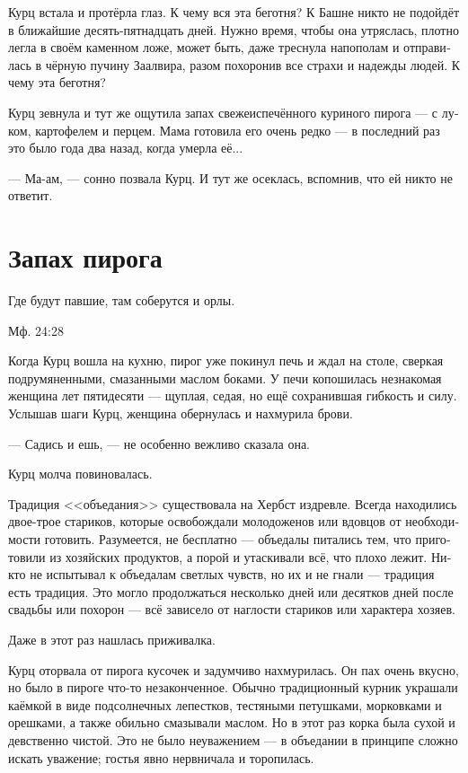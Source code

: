 \documentclass[a4paper,12pt,fleqn]{book}\usepackage{polyglossia}\setdefaultlanguage[babelshorthands=true]{russian}\setotherlanguage{english}\defaultfontfeatures{Ligatures=TeX,Mapping=tex-text}\usepackage{xcolor}\newcommand{\ml}[3]{#2}
\begin{document}
Курц встала и протёрла глаз.
К чему вся эта беготня?
К Башне никто не подойдёт в ближайшие десять-пятнадцать дней.
Нужно время, чтобы она утряслась, плотно легла в своём каменном ложе, может быть, даже треснула напополам и отправилась в чёрную пучину Заалвира, разом похоронив все страхи и надежды людей.
К чему эта беготня?

Курц зевнула и тут же ощутила запах свежеиспечённого куриного пирога --- с луком, картофелем и перцем.
Мама готовила его очень редко --- в последний раз это было года два назад, когда умерла её...

--- Ма-ам, --- сонно позвала Курц.
И тут же осеклась, вспомнив, что ей никто не ответит.

\section{Запах пирога}

\epigraph
{
\ml{$0$}
{Где будут павшие, там соберутся и орлы.}
{Wherever the dead shall be, there the eagles shall gather.}
}{Мф. 24:28}

Когда Курц вошла на кухню, пирог уже покинул печь и ждал на столе, сверкая подрумяненными, смазанными маслом боками.
У печи копошилась незнакомая женщина лет пятидесяти --- щуплая, седая, но ещё сохранившая гибкость и силу.
Услышав шаги Курц, женщина обернулась и нахмурила брови.

--- Садись и ешь, --- не особенно вежливо сказала она.

Курц молча повиновалась.

Традиция <<объедания>> существовала на Хербст издревле.
Всегда находились двое-трое стариков, которые освобождали молодоженов или вдовцов от необходимости готовить.
Разумеется, не бесплатно --- объедалы питались тем, что приготовили из хозяйских продуктов, а порой и утаскивали всё, что плохо лежит.
Никто не испытывал к объедалам светлых чувств, но их и не гнали --- традиция есть традиция.
Это могло продолжаться несколько дней или десятков дней после свадьбы или похорон --- всё зависело от наглости стариков или характера хозяев.

Даже в этот раз нашлась приживалка.

Курц оторвала от пирога кусочек и задумчиво нахмурилась.
Он пах очень вкусно, но было в пироге что-то незаконченное.
Обычно традиционный курник украшали каёмкой в виде подсолнечных лепестков, тестяными петушками, морковками и орешками, а также обильно смазывали маслом.
Но в этот раз корка была сухой и девственно чистой.
Это не было неуважением --- в объедании в принципе сложно искать уважение;
гостья явно нервничала и торопилась.
\end{document}
